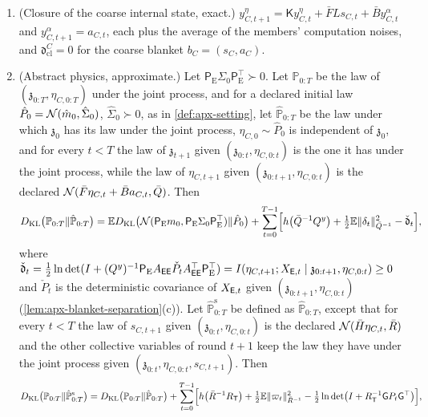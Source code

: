 \begin{theorem}
\begin{enumerate}
\item[(ii)] (Closure of the coarse internal state, exact.) $y^\eta_{C,t+1}=\mathsf Ky^\eta_{C,t}+\bar FLs_{C,t}+\bar By^\alpha_{C,t}$ and $y^\alpha_{C,t+1}=a_{C,t}$, each plus the average of the members' computation noises, and $\mathfrak d^C_{\mathrm{cl}}=0$ for the coarse blanket $b_C=(s_C,a_C)$.
\item[(iii)] (Abstract physics, approximate.) Let $\mathsf P_{\mathrm E}\Sigma_0\mathsf P_{\mathrm E}^\top\succ0$. Let $\mathbb P_{0:T}$ be the law of $(\mathfrak z_{0:T},\eta_{C,0:T})$ under the joint process, and for a declared initial law $\hat P_0=\mathcal{N}(\hat m_0,\hat\Sigma_0)$, $\hat\Sigma_0\succ0$, as in \cref{def:apx-setting}, let $\hat{\mathbb P}_{0:T}$ be the law under which $\mathfrak z_0$ has its law under the joint process, $\eta_{C,0}\sim\hat P_0$ is independent of $\mathfrak z_0$, and for every $t<T$ the law of $\mathfrak z_{t+1}$ given $(\mathfrak z_{0:t},\eta_{C,0:t})$ is the one it has under the joint process, while the law of $\eta_{C,t+1}$ given $(\mathfrak z_{0:t+1},\eta_{C,0:t})$ is the declared $\mathcal{N}(\bar F\eta_{C,t}+\bar Ba_{C,t},\bar Q)$. Then
\begin{equation}\label{eq:apx-blanket-path}
D_{\mathrm{KL}}\bigl(\mathbb P_{0:T}\Vert\hat{\mathbb P}_{0:T}\bigr)=\mathbb{E}D_{\mathrm{KL}}\bigl(\mathcal{N}(\mathsf P_{\mathrm E}m_0,\mathsf P_{\mathrm E}\Sigma_0\mathsf P_{\mathrm E}^\top)\Vert\hat P_0\bigr)+\sum_{t=0}^{T-1}\Bigl[h\bigl(\bar Q^{-1}Q^y\bigr)+\tfrac12\mathbb{E}\Vert\delta_t\Vert^2_{\bar Q^{-1}}-\check{\mathfrak d}_t\Bigr],
\end{equation}
where $\check{\mathfrak d}_t=\frac12\ln\det(I+(Q^y)^{-1}\mathsf P_{\mathrm E}A_{\mathsf{E}\mathsf{E}}\check P_tA_{\mathsf{E}\mathsf{E}}^\top\mathsf P_{\mathrm E}^\top)=I(\eta_{C,t+1};X_{\mathsf{E},t}\mid\mathfrak z_{0:t+1},\eta_{C,0:t})\ge0$ and $\check P_t$ is the deterministic covariance of $X_{\mathsf{E},t}$ given $(\mathfrak z_{0:t+1},\eta_{C,0:t})$ (\cref{lem:apx-blanket-separation}(c)). Let $\hat{\mathbb P}^{\mathrm s}_{0:T}$ be defined as $\hat{\mathbb P}_{0:T}$, except that for every $t<T$ the law of $s_{C,t+1}$ given $(\mathfrak z_{0:t},\eta_{C,0:t})$ is the declared $\mathcal{N}(\bar H\eta_{C,t},\bar R)$ and the other collective variables of round $t+1$ keep the law they have under the joint process given $(\mathfrak z_{0:t},\eta_{C,0:t},s_{C,t+1})$. Then
\begin{equation}\label{eq:apx-blanket-path-s}
\KL\bigl(\mathbb P_{0:T}\Vert\hat{\mathbb P}^{\mathrm s}_{0:T}\bigr)=\KL\bigl(\mathbb P_{0:T}\Vert\hat{\mathbb P}_{0:T}\bigr)+\sum_{t=0}^{T-1}\Bigl[h\bigl(\bar R^{-1}R_{\mathsf T}\bigr)+\tfrac12\E\Vert\varpi_t\Vert^2_{\bar R^{-1}}-\tfrac12\ln\det\bigl(I+R_{\mathsf T}^{-1}\mathsf GP_t\mathsf G^\top\bigr)\Bigr],

\end{equation}
\end{enumerate}
\end{theorem}
